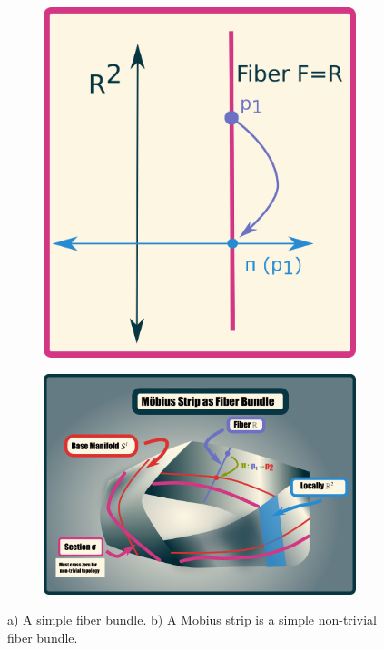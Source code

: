 \begin{figure}
  \begin{subfigure}{.4\textwidth}
  \includegraphics[width=\textwidth]{pics/r2.png}
  \caption{}
  \label{fig:r2}
\end{subfigure}
\begin{subfigure}{.6\textwidth}
  \includegraphics[width=\textwidth]{pics/mobius.png}
  \caption{}
  \label{fig:mobius}
\end{subfigure}
  \label{fig:fiberbundles}
  \caption{a) A simple fiber bundle. b) A Mobius strip is a simple non-trivial fiber bundle.}
\end{figure}

